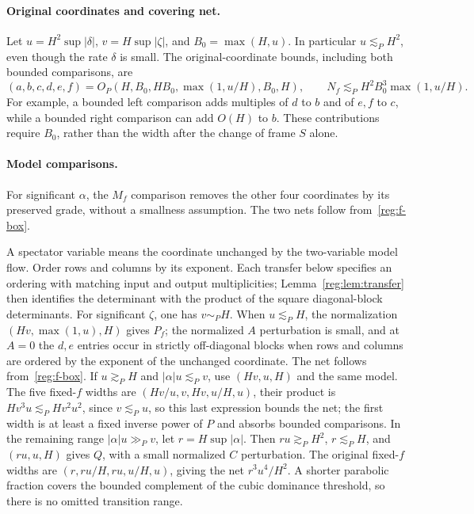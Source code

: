 \documentclass[11pt]{amsart}
\theoremstyle{definition}
\theoremstyle{remark}
\numberwithin{equation}{section}
\begin{document}
\paragraph{Original coordinates and covering net.}
Let $u=H^2\sup|\delta|$, $v=H\sup|\zeta|$, and $B_0=\max(H,u)$. In particular $u\lesssim_PH^2$, even though the rate $\delta$ is small. The original-coordinate bounds, including both bounded comparisons, are
\begin{equation}\label{reg:f-box}
(a,b,c,d,e,f)=O_P(H,B_0,HB_0,\max(1,u/H),B_0,H),\qquad N_f\lesssim_PH^2B_0^3\max(1,u/H).
\end{equation}
For example, a bounded left comparison adds multiples of $d$ to $b$ and of $e,f$ to $c$, while a bounded right comparison can add $O(H)$ to $b$. These contributions require $B_0$, rather than the width after the change of frame $S$ alone.

\paragraph{Model comparisons.}
For significant $\alpha$, the $M_f$ comparison removes the other four coordinates by its preserved grade, without a smallness assumption. The two nets follow from~\eqref{reg:f-box}.

A spectator variable means the coordinate unchanged by the two-variable model flow. Order rows and columns by its exponent. Each transfer below specifies an ordering with matching input and output multiplicities; Lemma~\ref{reg:lem:transfer} then identifies the determinant with the product of the square diagonal-block determinants.
For significant $\zeta$, one has $v\sim_PH$. When $u\lesssim_PH$, the normalization $(Hv,\max(1,u),H)$ gives $P_f$; the normalized $A$ perturbation is small, and at $A=0$ the $d,e$ entries occur in strictly off-diagonal blocks when rows and columns are ordered by the exponent of the unchanged coordinate. The net follows from~\eqref{reg:f-box}. If $u\gtrsim_PH$ and $|\alpha|u\lesssim_Pv$, use $(Hv,u,H)$ and the same model. The five fixed-$f$ widths are $(Hv/u,v,Hv,u/H,u)$, their product is $Hv^3u\lesssim_PHv^2u^2$, since $v\lesssim_Pu$, so this last expression bounds the net; the first width is at least a fixed inverse power of $P$ and absorbs bounded comparisons. In the remaining range $|\alpha|u\gg_Pv$, let $r=H\sup|\alpha|$. Then $ru\gtrsim_PH^2$, $r\lesssim_PH$, and $(ru,u,H)$ gives $Q$, with a small normalized $C$ perturbation. The original fixed-$f$ widths are $(r,ru/H,ru,u/H,u)$, giving the net $r^3u^4/H^2$. A shorter parabolic fraction covers the bounded complement of the cubic dominance threshold, so there is no omitted transition range.
\end{document}
